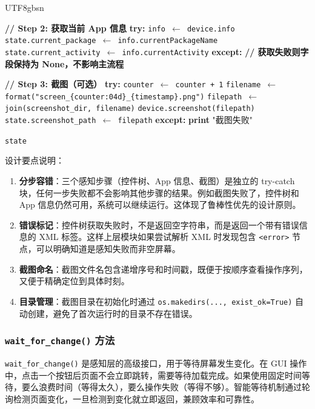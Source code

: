 \documentclass{article}
\begin{document}
\begin{CJK}{UTF8}{gbsn}
\begin{algorithm}[h]
\begin{algorithmic}[1]
    \STATE \textbf{// Step 2: 获取当前 App 信息}
    \STATE \textbf{try:}
    \STATE \quad \texttt{info $\leftarrow$ device.info}
    \STATE \quad \texttt{state.current\_package $\leftarrow$ info.currentPackageName}
    \STATE \quad \texttt{state.current\_activity $\leftarrow$ info.currentActivity}
    \STATE \textbf{except:}
    \STATE \quad \textbf{// 获取失败则字段保持为 None，不影响主流程}

    \STATE \textbf{// Step 3: 截图（可选）}
      \STATE \textbf{try:}
      \STATE \quad \texttt{counter $\leftarrow$ counter + 1}
      \STATE \quad \texttt{filename $\leftarrow$ format("screen\_\{counter:04d\}\_\{timestamp\}.png")}
      \STATE \quad \texttt{filepath $\leftarrow$ join(screenshot\_dir, filename)}
      \STATE \quad \texttt{device.screenshot(filepath)}
      \STATE \quad \texttt{state.screenshot\_path $\leftarrow$ filepath}
      \STATE \textbf{except:}
      \STATE \quad \textbf{print} "截图失败"
    \ENDIF

    \RETURN \texttt{state}
  \end{algorithmic}
\end{algorithm}

设计要点说明：

\begin{enumerate}[leftmargin=1.5em]
  \item \textbf{分步容错}：三个感知步骤（控件树、App 信息、截图）是独立的 try-catch 块，任何一步失败都不会影响其他步骤的结果。例如截图失败了，控件树和 App 信息仍然可用，系统可以继续运行。这体现了鲁棒性优先的设计原则。
  \item \textbf{错误标记}：控件树获取失败时，不是返回空字符串，而是返回一个带有错误信息的 XML 标签。这样上层模块如果尝试解析 XML 时发现包含 \texttt{<error>} 节点，可以明确知道是感知失败而非空屏幕。
  \item \textbf{截图命名}：截图文件名包含递增序号和时间戳，既便于按顺序查看操作序列，又便于精确定位到具体时刻。
  \item \textbf{目录管理}：截图目录在初始化时通过 \texttt{os.makedirs(..., exist\_ok=True)} 自动创建，避免了首次运行时的目录不存在错误。
\end{enumerate}

\subsubsection{\texttt{wait\_for\_change()} 方法}

\texttt{wait\_for\_change()} 是感知层的高级接口，用于等待屏幕发生变化。在 GUI 操作中，点击一个按钮后页面不会立即跳转，需要等待加载完成。如果使用固定时间等待，要么浪费时间（等得太久），要么操作失败（等得不够）。智能等待机制通过轮询检测页面变化，一旦检测到变化就立即返回，兼顾效率和可靠性。


\end{CJK}
\end{document}
